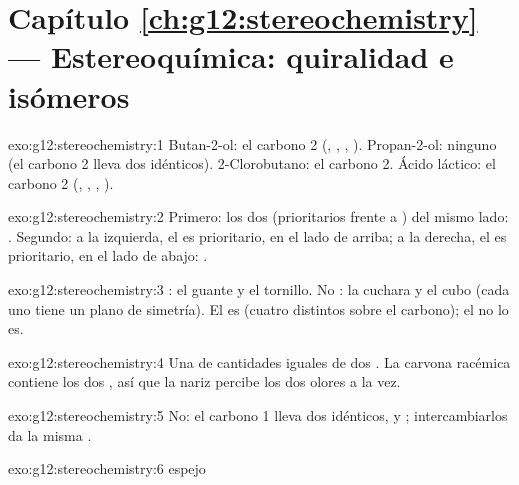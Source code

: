 \section*{Capítulo \ref{ch:g12:stereochemistry} --- Estereoquímica: quiralidad e isómeros}

\begin{solution}{exo:g12:stereochemistry:1}
Butan-2-ol: el carbono 2 (, , , ).
Propan-2-ol: ninguno (el carbono 2 lleva dos  idénticos).
2-Clorobutano: el carbono 2. Ácido láctico: el carbono 2 (, ,
, ).
\end{solution}

\begin{solution}{exo:g12:stereochemistry:2}
Primero: los dos  (prioritarios frente a ) del mismo lado: .
Segundo: a la izquierda, el  es prioritario, en el lado de arriba;
a la derecha, el  es prioritario, en el lado de abajo: .
\end{solution}

\begin{solution}{exo:g12:stereochemistry:3}
: el guante y el tornillo. No : la cuchara y el cubo
(cada uno tiene un plano de simetría). El  es  (cuatro
 distintos sobre el carbono); el  no lo es.
\end{solution}

\begin{solution}{exo:g12:stereochemistry:4}
Una  de cantidades iguales de dos . La carvona
racémica contiene los dos , así que la nariz percibe los dos
olores a la vez.
\end{solution}

\begin{solution}{exo:g12:stereochemistry:5}
No: el carbono 1 lleva dos  idénticos,  y ;
intercambiarlos da la misma .
\end{solution}

\begin{solution}{exo:g12:stereochemistry:6}
 \quad espejo
\quad {}
\end{solution}

